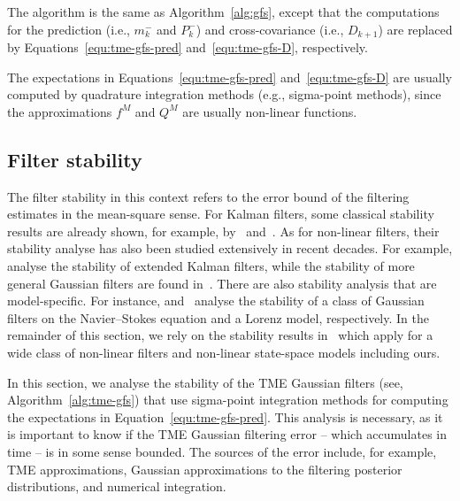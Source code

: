 \begin{algorithm}
	\label{alg:tme-gfs}
	The algorithm is the same as Algorithm~\ref{alg:gfs}, except that the computations for the prediction (i.e., $m^-_k$ and $P^-_k$) and cross-covariance (i.e., $D_{k+1}$) are replaced by Equations~\eqref{equ:tme-gfs-pred} and~\eqref{equ:tme-gfs-D}, respectively.
\end{algorithm}

The expectations in Equations~\eqref{equ:tme-gfs-pred} and~\eqref{equ:tme-gfs-D} are usually computed by quadrature integration methods (e.g., sigma-point methods), since the approximations $f^M$ and $Q^M$ are usually non-linear functions. 

\subsection{Filter stability}
\label{sec:tme-stability}
The filter stability in this context refers to the error bound of the filtering estimates in the mean-square sense. For Kalman filters, some classical stability results are already shown, for example, by~\citet{Jazwinski1970} and~\citet{Anderson1981}. As for non-linear filters, their stability analyse has also been studied extensively in recent decades. For example, \citet{Reif1999} analyse the stability of extended Kalman filters, while the stability of more general Gaussian filters are found in~\citet{Kazufumi2000, Xiong2006}. There are also stability analysis that are model-specific. For instance, \citet{Blomker2013} and~\citet{LawK2014} analyse the stability of a class of Gaussian filters on the Navier--Stokes equation and a Lorenz model, respectively. In the remainder of this section, we rely on the stability results in~\citet{Toni2020} which apply for a wide class of non-linear filters and non-linear state-space models including ours. 

In this section, we analyse the stability of the TME Gaussian filters (see, Algorithm~\ref{alg:tme-gfs}) that use sigma-point integration methods for computing the expectations in Equation~\eqref{equ:tme-gfs-pred}. This analysis is necessary, as it is important to know if the TME Gaussian filtering error -- which accumulates in time -- is in some sense bounded. The sources of the error include, for example, TME approximations, Gaussian approximations to the filtering posterior distributions, and numerical integration. 

